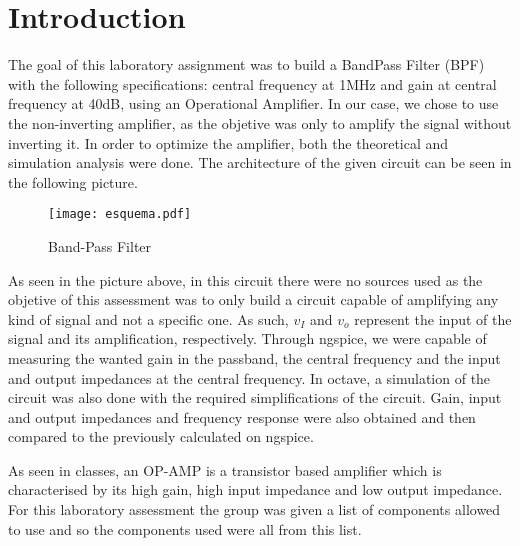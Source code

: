 \section{Introduction}
\label{sec:introduction}

\par The goal of this laboratory assignment was to build a BandPass Filter (BPF) with the following specifications: central frequency at 1MHz and gain at central frequency at 40dB, using an Operational Amplifier. In our case, we chose to use the non-inverting amplifier, as the objetive was only to amplify the signal without inverting it. In order to optimize the amplifier, both the theoretical and simulation analysis were done. The architecture of the given circuit can be seen in the following picture.

\begin{figure}[H] \centering
	\texttt{[image: esquema.pdf]}
	\caption{Band-Pass Filter}
	\label{fig:1}
\end{figure}

\par As seen in the picture above, in this circuit there were no sources used as the objetive of this assessment was to only build a circuit capable of amplifying any kind of signal and not a specific one. As such, $v_I$ and $v_o$ represent the input of the signal and its amplification, respectively. Through ngspice,  we were capable of measuring the wanted gain in the passband, the central frequency and the input and output impedances at the central frequency. In octave, a simulation of the circuit was also done with the required simplifications of the circuit. Gain, input and output impedances and frequency response were also obtained and then compared to the previously calculated on ngspice.

\par As seen in classes, an OP-AMP is a transistor based amplifier which is characterised by its high gain, high input impedance and low output impedance. For this laboratory assessment the group was given a list of components allowed to use and so the components used were all from this list.

\newpage
